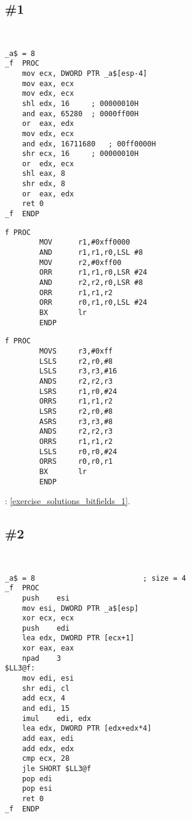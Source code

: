 \section{\Exercises}

\subsection{\Exercise \#1}
\label{exercise_bitfields_1}

\WhatThisCodeDoes\

\begin{lstlisting}[caption=MSVC 2010 /Ox]
_a$ = 8
_f	PROC
	mov	ecx, DWORD PTR _a$[esp-4]
	mov	eax, ecx
	mov	edx, ecx
	shl	edx, 16		; 00000010H
	and	eax, 65280	; 0000ff00H
	or	eax, edx
	mov	edx, ecx
	and	edx, 16711680	; 00ff0000H
	shr	ecx, 16		; 00000010H
	or	edx, ecx
	shl	eax, 8
	shr	edx, 8
	or	eax, edx
	ret	0
_f	ENDP
\end{lstlisting}

\begin{lstlisting}[caption=\Optimizing{} Keil 5.03 (\ARMMode)]
f PROC
        MOV      r1,#0xff0000
        AND      r1,r1,r0,LSL #8
        MOV      r2,#0xff00
        ORR      r1,r1,r0,LSR #24
        AND      r2,r2,r0,LSR #8
        ORR      r1,r1,r2
        ORR      r0,r1,r0,LSL #24
        BX       lr
        ENDP
\end{lstlisting}

\begin{lstlisting}[caption=\Optimizing{} Keil 5.03 (\ThumbMode)]
f PROC
        MOVS     r3,#0xff
        LSLS     r2,r0,#8
        LSLS     r3,r3,#16
        ANDS     r2,r2,r3
        LSRS     r1,r0,#24
        ORRS     r1,r1,r2
        LSRS     r2,r0,#8
        ASRS     r3,r3,#8
        ANDS     r2,r2,r3
        ORRS     r1,r1,r2
        LSLS     r0,r0,#24
        ORRS     r0,r0,r1
        BX       lr
        ENDP
\end{lstlisting}

\Answer{}: \ref{exercise_solutions_bitfields_1}.

\subsection{\Exercise \#2}
\label{exercise_bitfields_2}

\WhatThisCodeDoes\

\begin{lstlisting}[caption=MSVC 2010 /Ox]
_a$ = 8							; size = 4
_f	PROC
	push	esi
	mov	esi, DWORD PTR _a$[esp]
	xor	ecx, ecx
	push	edi
	lea	edx, DWORD PTR [ecx+1]
	xor	eax, eax
	npad	3
$LL3@f:
	mov	edi, esi
	shr	edi, cl
	add	ecx, 4
	and	edi, 15
	imul	edi, edx
	lea	edx, DWORD PTR [edx+edx*4]
	add	eax, edi
	add	edx, edx
	cmp	ecx, 28
	jle	SHORT $LL3@f
	pop	edi
	pop	esi
	ret	0
_f	ENDP
\end{lstlisting}

